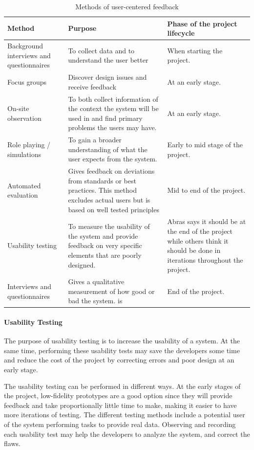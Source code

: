 \begin{table}[H]
\begin{tabular}{|p{3.5cm} | p{5cm} | p{5cm} |}
\hline
\textbf{Method} & \textbf{Purpose} & \textbf{Phase of the project lifecycle} \\ \hline
Background interviews and questionnaires & To collect data and to understand the user better & When starting the project. \\ \hline
Focus groups & Discover design issues and receive feedback & At an early stage. \\ \hline
On-site observation & To both collect information of the context the system will be used in and find primary problems the users may have. & At an early stage. \\ \hline
Role playing / simulations & To gain a broader understanding of what the user expects from the system. & Early to mid stage of the project. \\ \hline
Automated evaluation & Gives feedback on deviations from standards or best practices. This method excludes actual users but is based on well tested principles & Mid to end of the project. \\ \hline
Usability testing & To measure the usability of the system and provide feedback on very specific elements that are poorly designed. & Abras\cite{abrasusercentereddesign} says it should be at the end of the project while others\cite{schneidermanusercentered} think it should be done in iterations throughout the project. \\ \hline
Interviews and questionnaires & Gives a qualitative measurement of how good or bad the system. is & End of the project. \\ \hline
\end{tabular}
\caption{Methods of user-centered feedback}
\label{table:designduringlifecycle}
\end{table}


\paragraph{Usability Testing}
The purpose of usability testing is to increase the usability of a system. At the same time, performing these usability tests may save the developers some time and reduce the cost of the project by correcting errors and poor design at an early stage\cite{dumas1995practical}.

The usability testing can be performed in different ways\cite{schneidermanusercentered}. At the early stages of the project, low-fidelity prototypes are a good option since they will provide feedback and take proportionally little time to make, making it easier to have more iterations of testing. The different testing methods include a potential user of the system performing tasks to provide real data. Observing and recording each usability test may help the developers to analyze the system, and correct the flaws\cite{dumas1995practical}. 

